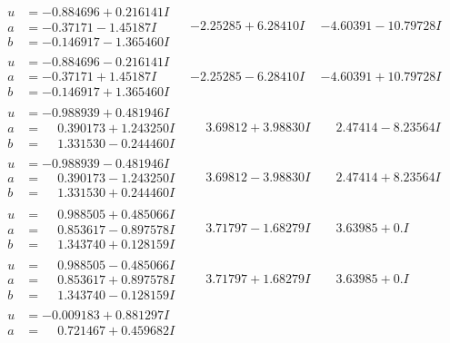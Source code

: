 \documentclass[1p]{elsarticle_modified}
\theoremstyle{definition}
\begin{document}
$$\begin{array}{c|c|c}
\begin{aligned}
u &= -0.884696 + 0.216141 I \\
a &= -0.37171 - 1.45187 I \\
b &= -0.146917 - 1.365460 I\end{aligned}
 & -2.25285 + 6.28410 I & -4.60391 - 10.79728 I \\ \hline\begin{aligned}
u &= -0.884696 - 0.216141 I \\
a &= -0.37171 + 1.45187 I \\
b &= -0.146917 + 1.365460 I\end{aligned}
 & -2.25285 - 6.28410 I & -4.60391 + 10.79728 I \\ \hline\begin{aligned}
u &= -0.988939 + 0.481946 I \\
a &= \phantom{-}0.390173 + 1.243250 I \\
b &= \phantom{-}1.331530 - 0.244460 I\end{aligned}
 & \phantom{-}3.69812 + 3.98830 I & \phantom{-}2.47414 - 8.23564 I \\ \hline\begin{aligned}
u &= -0.988939 - 0.481946 I \\
a &= \phantom{-}0.390173 - 1.243250 I \\
b &= \phantom{-}1.331530 + 0.244460 I\end{aligned}
 & \phantom{-}3.69812 - 3.98830 I & \phantom{-}2.47414 + 8.23564 I \\ \hline\begin{aligned}
u &= \phantom{-}0.988505 + 0.485066 I \\
a &= \phantom{-}0.853617 - 0.897578 I \\
b &= \phantom{-}1.343740 + 0.128159 I\end{aligned}
 & \phantom{-}3.71797 - 1.68279 I & \phantom{-}3.63985 + 0. I\phantom{ +0.000000I} \\ \hline\begin{aligned}
u &= \phantom{-}0.988505 - 0.485066 I \\
a &= \phantom{-}0.853617 + 0.897578 I \\
b &= \phantom{-}1.343740 - 0.128159 I\end{aligned}
 & \phantom{-}3.71797 + 1.68279 I & \phantom{-}3.63985 + 0. I\phantom{ +0.000000I} \\ \hline\begin{aligned}
u &= -0.009183 + 0.881297 I \\
a &= \phantom{-}0.721467 + 0.459682 I \\

\end{aligned}
\end{array}$$
\end{document}
